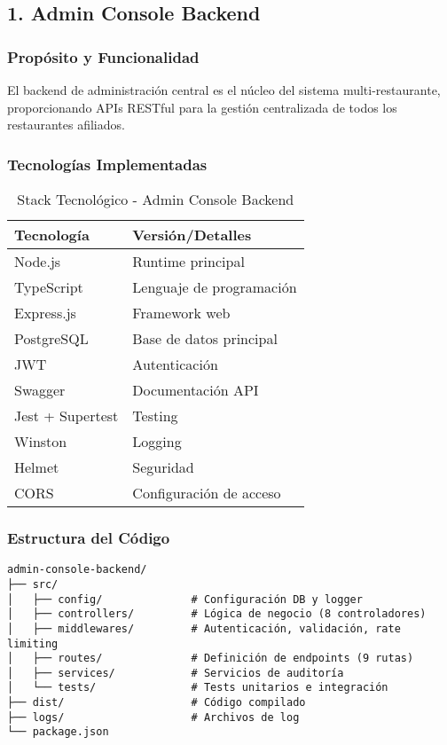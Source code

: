 \documentclass[12pt,a4paper]{article}
\begin{document}
\subsection{1. Admin Console Backend}

\subsubsection{Propósito y Funcionalidad}
El backend de administración central es el núcleo del sistema multi-restaurante, proporcionando APIs RESTful para la gestión centralizada de todos los restaurantes afiliados.

\subsubsection{Tecnologías Implementadas}
\begin{table}[H]
\centering
\begin{tabular}{@{}ll@{}}
\toprule
\textbf{Tecnología} & \textbf{Versión/Detalles} \\
\midrule
Node.js & Runtime principal \\
TypeScript & Lenguaje de programación \\
Express.js & Framework web \\
PostgreSQL & Base de datos principal \\
JWT & Autenticación \\
Swagger & Documentación API \\
Jest + Supertest & Testing \\
Winston & Logging \\
Helmet & Seguridad \\
CORS & Configuración de acceso \\
\bottomrule
\end{tabular}
\caption{Stack Tecnológico - Admin Console Backend}
\end{table}

\subsubsection{Estructura del Código}
\begin{verbatim}
admin-console-backend/
├── src/
│   ├── config/              # Configuración DB y logger
│   ├── controllers/         # Lógica de negocio (8 controladores)
│   ├── middlewares/         # Autenticación, validación, rate limiting
│   ├── routes/              # Definición de endpoints (9 rutas)
│   ├── services/            # Servicios de auditoría
│   └── tests/               # Tests unitarios e integración
├── dist/                    # Código compilado
├── logs/                    # Archivos de log
└── package.json
\end{verbatim}
\end{document}
